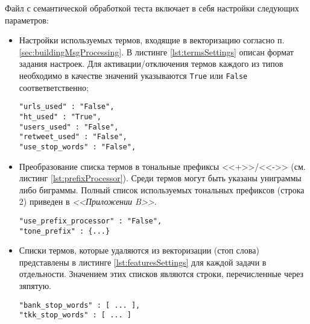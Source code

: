     Файл с семантической обработкой теста включает в себя настройки следующих
    параметров:
    \begin{itemize}
        \item Настройки используемых термов, входящие в векторизацию согласно
            п. \ref{sec:buildingMsgProcessing}. В листинге \ref{lst:termsSettings}
            описан формат задания настроек. Для активации/отключения термов
            каждого из типов необходимо в качестве значений указываются {\tt True}
            или {\tt False} соответветственно;

            \begin{lstlisting}[caption="Указание используемых в векторизации термов", label={lst:termsSettings}]
"urls_used" : "False",
"ht_used" : "True",
"users_used" : "False",
"retweet_used" : "False",
"use_stop_words" : "False",
            \end{lstlisting}

        \item Преобразование списка термов в тональные префиксы <<+>>/<<->> (см. листинг \ref{lst:prefixProcessor}).
            Среди термов могут быть указаны униграммы либо биграммы. Полный список
            используемых тональных префиксов (строка 2) приведен в {\it <<Приложении B>>}.
            \begin{lstlisting}[caption="Настройка преобразования термов в тональные префиксы", label={lst:prefixProcessor}]
"use_prefix_processor" : "False",
"tone_prefix" : {...}
            \end{lstlisting}
        \item Списки термов, которые удаляются из векторизации (стоп слова)
            представлены в листинге \ref{lst:featuresSettings} для каждой задачи в отдельности.
            Значением этих списков являются строки, перечисленные через зяпятую.

            \begin{lstlisting}[caption="Настройка используемых списков стоп слов", label={lst:featuresSettings}]
"bank_stop_words" : [ ... ],
"tkk_stop_words" : [ ... ]
            \end{lstlisting}
    \end{itemize}

